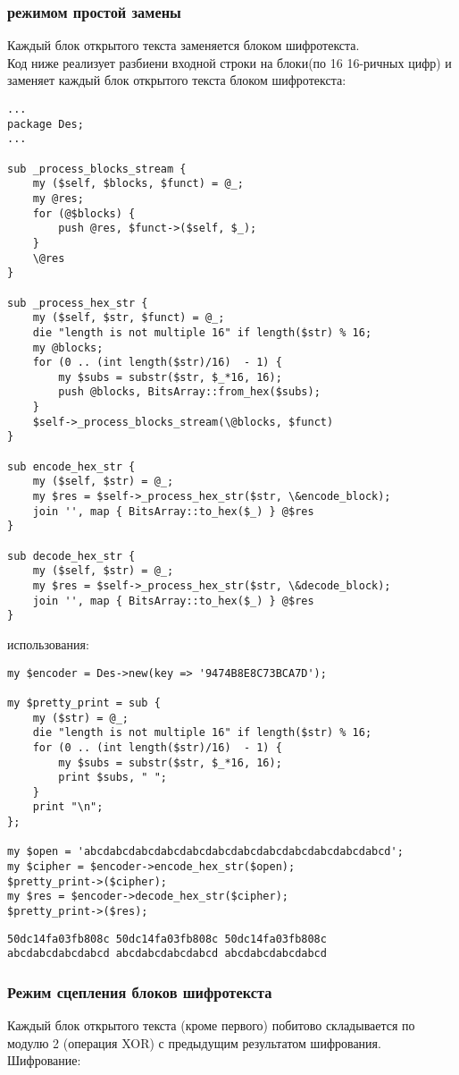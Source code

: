 \documentclass[10pt,a4paper]{article}
\begin{document}
\subsubsection*{режимом простой замены}
Каждый блок открытого текста заменяется блоком шифротекста. \\
Код ниже реализует разбиени входной строки на блоки(по 16 16-ричных
цифр) и заменяет каждый блок открытого текста блоком шифротекста:
\begin{lstlisting}
...
package Des;
...

sub _process_blocks_stream {
    my ($self, $blocks, $funct) = @_;
    my @res;
    for (@$blocks) {
        push @res, $funct->($self, $_);
    }
    \@res
}

sub _process_hex_str {
    my ($self, $str, $funct) = @_;
    die "length is not multiple 16" if length($str) % 16;
    my @blocks;
    for (0 .. (int length($str)/16)  - 1) {
        my $subs = substr($str, $_*16, 16);
        push @blocks, BitsArray::from_hex($subs);
    }
    $self->_process_blocks_stream(\@blocks, $funct)
}

sub encode_hex_str {
    my ($self, $str) = @_;
    my $res = $self->_process_hex_str($str, \&encode_block);
    join '', map { BitsArray::to_hex($_) } @$res
}

sub decode_hex_str {
    my ($self, $str) = @_;
    my $res = $self->_process_hex_str($str, \&decode_block);
    join '', map { BitsArray::to_hex($_) } @$res
}
\end{lstlisting}
{ использования:}
\begin{lstlisting}
my $encoder = Des->new(key => '9474B8E8C73BCA7D');

my $pretty_print = sub {
    my ($str) = @_;
    die "length is not multiple 16" if length($str) % 16;
    for (0 .. (int length($str)/16)  - 1) {
        my $subs = substr($str, $_*16, 16);
        print $subs, " ";
    }
    print "\n";
};

my $open = 'abcdabcdabcdabcdabcdabcdabcdabcdabcdabcdabcdabcd';
my $cipher = $encoder->encode_hex_str($open);
$pretty_print->($cipher);
my $res = $encoder->decode_hex_str($cipher);
$pretty_print->($res);
\end{lstlisting}
{}
\begin{lstlisting}
50dc14fa03fb808c 50dc14fa03fb808c 50dc14fa03fb808c 
abcdabcdabcdabcd abcdabcdabcdabcd abcdabcdabcdabcd 
\end{lstlisting}


\subsubsection*{Режим сцепления блоков шифротекста}
Каждый блок открытого текста (кроме первого) побитово складывается по
модулю 2 (операция XOR) с предыдущим результатом
шифрования. Шифрование:
\end{document}
